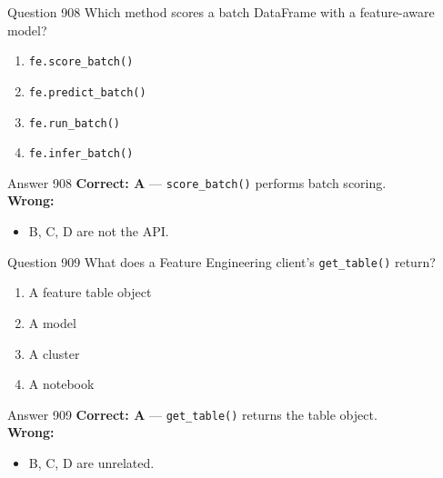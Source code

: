 \documentclass[aspectratio=169,11pt]{beamer}
\begin{document}
	\begin{frame}{Question 908}
		Which method scores a batch DataFrame with a feature-aware model?
		\begin{enumerate}[label=\Alph*.]
			\item \texttt{fe.score\_batch()}
			\item \texttt{fe.predict\_batch()}
			\item \texttt{fe.run\_batch()}
			\item \texttt{fe.infer\_batch()}
		\end{enumerate}
	\end{frame}
	\begin{frame}{Answer 908}
		\textbf{Correct: A} --- \texttt{score\_batch()} performs batch scoring.\\
		\vspace{0.5em}
		\textbf{Wrong:}
		\begin{itemize}
			\item B, C, D are not the API.
		\end{itemize}
	\end{frame}
	
	\begin{frame}{Question 909}
		What does a Feature Engineering client's \texttt{get\_table()} return?
		\begin{enumerate}[label=\Alph*.]
			\item A feature table object
			\item A model
			\item A cluster
			\item A notebook
		\end{enumerate}
	\end{frame}
	\begin{frame}{Answer 909}
		\textbf{Correct: A} --- \texttt{get\_table()} returns the table object.\\
		\vspace{0.5em}
		\textbf{Wrong:}
		\begin{itemize}
			\item B, C, D are unrelated.
		\end{itemize}
	\end{frame}
	
\end{document}
